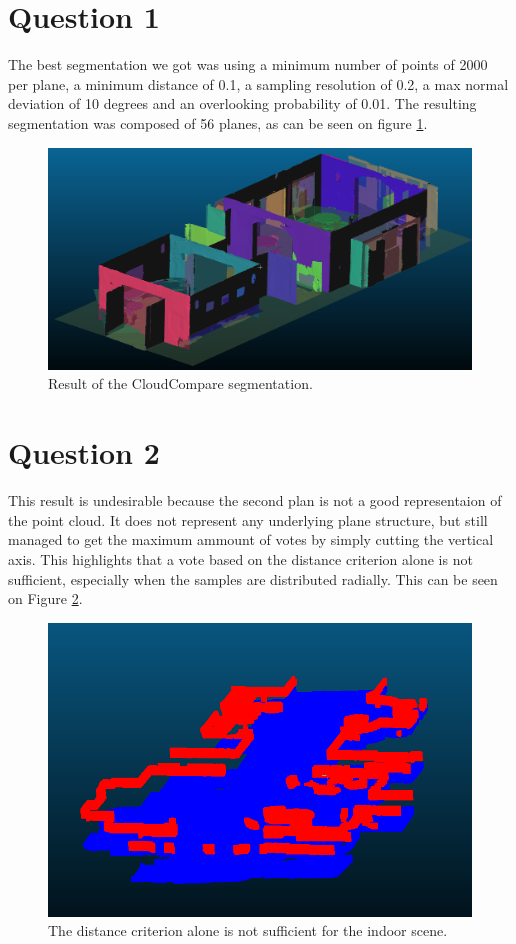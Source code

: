 \documentclass[a4paper]{article}
\begin{document}





\section*{Question 1}

The best segmentation we got was using a minimum number of points of 2000 per plane, a minimum distance of 0.1, a sampling resolution of 0.2, a max normal deviation of 10 degrees and an overlooking probability of 0.01.
The resulting segmentation was composed of 56 planes, as can be seen on figure \ref{fig:Q1}.

\begin{figure}[ht]
    \centering
    \includegraphics[width=0.3\linewidth]{figures/Q1.png}
    \caption{Result of the CloudCompare segmentation.}
    \label{fig:Q1}
\end{figure}


\section*{Question 2}

This result is undesirable because the second plan is not a good representaion of the point cloud. It does not represent any underlying plane structure,
but still managed to get the maximum ammount of votes by simply cutting the vertical axis. This highlights that a vote based on the distance criterion alone is not sufficient, especially 
when the samples are distributed radially. This can be seen on Figure \ref{fig:Q2}.

\begin{figure}[ht]
    \centering
    \includegraphics[width=0.3\linewidth]{figures/Q2.png}
    \caption{The distance criterion alone is not sufficient for the indoor scene.}
    \label{fig:Q2}
\end{figure}
\end{document}
